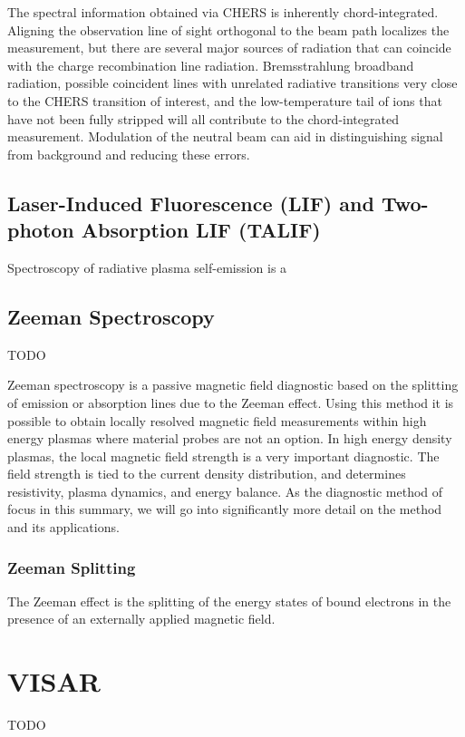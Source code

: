 \documentclass{jpp}
\begin{document}
The spectral information obtained via CHERS is inherently chord-integrated. Aligning the observation line of sight orthogonal to the beam path localizes the measurement, but there are several major sources of radiation that can coincide with the charge recombination line radiation. Bremsstrahlung broadband radiation, possible coincident lines with unrelated radiative transitions very close to the CHERS transition of interest, and the low-temperature tail of ions that have not been fully stripped will all contribute to the chord-integrated measurement. Modulation of the neutral beam can aid in distinguishing signal from background and reducing these errors.


\subsection{Laser-Induced Fluorescence (LIF) and Two-photon Absorption LIF (TALIF)}

\citep{MageeRM2012Atpa}

Spectroscopy of radiative plasma self-emission is a

\subsection{Zeeman Spectroscopy}

{\Large TODO \par}

Zeeman spectroscopy is a passive magnetic field diagnostic based on the splitting of emission or absorption lines due to the Zeeman effect. Using this method it is possible to obtain locally resolved magnetic field measurements within high energy plasmas where material probes are not an option. In high energy density plasmas, the local magnetic field strength is a very important diagnostic. The field strength is tied to the current density distribution, and determines resistivity, plasma dynamics, and energy balance. As the diagnostic method of focus in this summary, we will go into significantly more detail on the method and its applications.

\subsubsection{Zeeman Splitting}

The Zeeman effect is the splitting of the energy states of bound electrons in the presence of an externally applied magnetic field. 

\section{VISAR}
{\Large TODO \par}
\citep{doi:10.1063/1.1660986}
\end{document}
